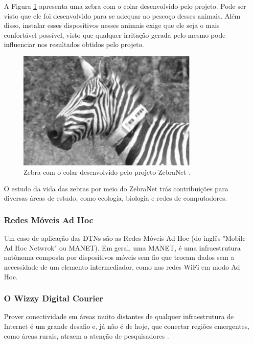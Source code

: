 A Figura \ref{zebra} apresenta uma zebra com o colar desenvolvido pelo projeto. Pode ser visto que ele foi desenvolvido para se adequar ao pescoço desses animais. Além disso, instalar esses dispositivos nesses animais exige que ele seja o mais confortável possível, visto que qualquer irritação gerada pelo mesmo pode influenciar nos resultados obtidos pelo projeto.

\begin{figure}[htp!]
    \centering
    \includegraphics[width=0.8\textwidth]{figuras/cap_2/secao_1/zebranet.png}
    \caption{Zebra com o colar desenvolvido pelo projeto ZebraNet \cite{zhang2004hardware}.}
    \label{zebra}
\end{figure}

O estudo da vida das zebras por meio do ZebraNet trás contribuições para diversas áreas de estudo, como ecologia, biologia e redes de computadores.

\subsubsection{Redes Móveis Ad Hoc}

Um caso de aplicação das DTNs são as Redes Móveis Ad Hoc (do inglês "Mobile Ad Hoc Netwrok" ou MANET). Em geral, uma MANET, é uma infraestrutura autônoma composta por dispositivos móveis sem fio que trocam dados sem a necessidade de um elemento intermediador, como nas redes WiFi em modo Ad Hoc.

\subsubsection{O Wizzy Digital Courier}

Prover conectividade em áreas muito distantes de qualquer infraestrutura de Internet é um grande desafio e, já não é de hoje, que conectar regiões emergentes, como áreas rurais, atraem a atenção de pesquisadores \cite{tierProject}.

